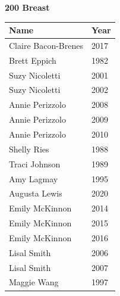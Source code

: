 \vspace{1.2em}
\noindent\begin{minipage}[t]{0.48\textwidth}
\centering
\textbf{\textcolor{teamprimary}{200 Breast}}\par
\vspace{0.5em}
\centering
\small
\renewcommand{\arraystretch}{1.0}
\setlength{\tabcolsep}{4pt}
\begin{tabular}{@{}p{3.0cm}p{1.0cm}@{}}
\toprule
\textbf{Name} & \textbf{Year} \\
\midrule
Claire Bacon-Brenes & 2017 \\
Brett Eppich & 1982 \\
Suzy Nicoletti & 2001 \\
Suzy Nicoletti & 2002 \\
Annie Perizzolo & 2008 \\
Annie Perizzolo & 2009 \\
Annie Perizzolo & 2010 \\
Shelly Ries & 1988 \\
Traci Johnson & 1989 \\
Amy Lagmay & 1995 \\
Augusta Lewis & 2020 \\
Emily McKinnon & 2014 \\
Emily McKinnon & 2015 \\
Emily McKinnon & 2016 \\
Lisal Smith & 2006 \\
Lisal Smith & 2007 \\
Maggie Wang & 1997 \\
\bottomrule
\end{tabular}
\end{minipage}
\hfill
